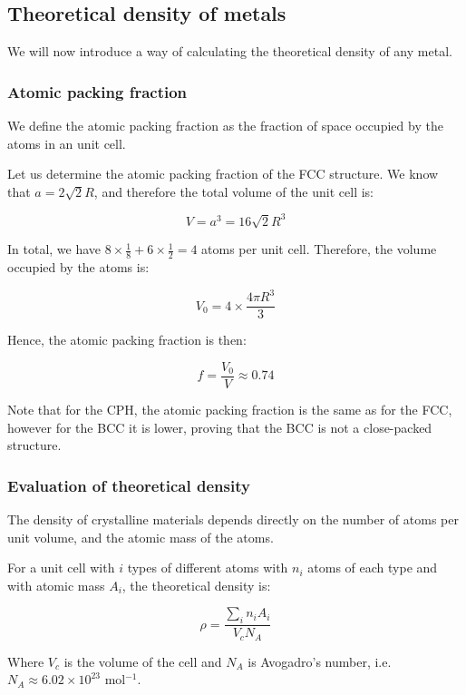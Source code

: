 \documentclass{article}
\begin{document}
\newpage

\subsection{Theoretical density of metals}

We will now introduce a way of calculating the theoretical density of any metal.

\subsubsection{Atomic packing fraction}

\begin{definition}
    We define the atomic packing fraction as the fraction of space occupied by the atoms in an unit cell.
\end{definition}

\begin{example}
    Let us determine the atomic packing fraction of the FCC structure. We know that $a = 2\sqrt{2}R$, and therefore the total volume of the unit cell is:

    \[ V = a^3 = 16\sqrt{2}R^3 \]

    In total, we have $8 \times \frac{1}{8} + 6 \times \frac{1}{2} = 4$ atoms per unit cell. Therefore, the volume occupied by the atoms is:

    \[ V_0 = 4 \times \frac{4\pi R^3}{3} \]

    Hence, the atomic packing fraction is then:

    \[ f = \frac{V_0}{V} \approx 0.74 \]
\end{example}

Note that for the CPH, the atomic packing fraction is the same as for the FCC, however for the BCC it is lower, proving that the BCC is not a close-packed structure.

\subsubsection{Evaluation of theoretical density}

The density of crystalline materials depends directly on the number of atoms per unit volume, and the atomic mass of the atoms.

\begin{proposition}
    For a unit cell with $i$ types of different atoms with $n_i$ atoms of each type and with atomic mass $A_i$, the theoretical density is:

    \[ \rho = \frac{\sum_i n_iA_i}{V_cN_A} \]

    Where $V_c$ is the volume of the cell and $N_A$ is Avogadro's number, i.e. $N_A \approx 6.02 \times 10^{23}$ mol$^{-1}$.
\end{proposition}
\end{document}
